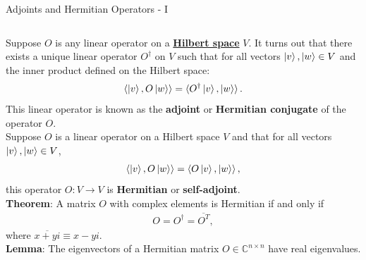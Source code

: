 \documentclass{beamer}
\begin{document}
\begin{frame}{Adjoints and Hermitian Operators - I}
  {\tiny
    \begin{columns}
    Suppose $O$ is any linear operator on a
    \href{https://mathworld.wolfram.com/HilbertSpace.html}{\textbf{Hilbert space}} $V$.
    It turns out that there exists a unique linear operator $O^{\dagger}$ on $V$
    such that for all vectors $\ket{v}, \ket{w} \in V$ and the inner product defined
    on the Hilbert space:
    \begin{align*}
      \braket{\ket{v}, O\ket{w}} = \braket{O^{\dagger} \ket{v}, \ket{w}}.
    \end{align*}
    This linear operator is known as the \textbf{adjoint} or \textbf{Hermitian conjugate} of the operator $O$. \\

    \vspace{0.3cm}
    Suppose $O$ is a linear operator on a Hilbert space $V$ and that for all vectors $\ket{v}, \ket{w} \in V$,
    \begin{align*}
      \braket{\ket{v}, O\ket{w}} = \braket{O \ket{v}, \ket{w}},
    \end{align*}
    this operator $O: V \rightarrow V$ is \textbf{Hermitian} or \textbf{self-adjoint}. \\

    \vspace{0.3cm}
    \textbf{Theorem}\cite{thespectraltheoremforhermitianmatrice}: A matrix $O$ with complex elements is Hermitian if and only if \\
    \begin{align*}
      O = O^{\dagger} = \overline{O^T},
    \end{align*}
    where $\overline{x + yi} \equiv x - yi$. \\

    \vspace{0.3cm}
    \textbf{Lemma}\cite{thespectraltheoremforhermitianmatrice}: The eigenvectors of a Hermitian matrix $O \in \mathbb{C}^{n \times n}$ have real eigenvalues. \\


\end{columns}}
\end{frame}
\end{document}
